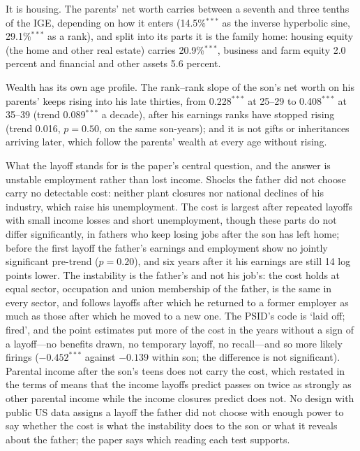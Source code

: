 It is housing. The parents' net worth carries between a seventh and three tenths of the IGE, depending on how it
enters (14.5\%$^{***}$ as the inverse hyperbolic sine, 29.1\%$^{***}$ as a rank), and split into its parts it is the
family home: housing equity (the home and other real estate) carries 20.9\%$^{***}$, business and farm equity 2.0 percent and financial and other assets
5.6 percent.

Wealth has its own age profile. The rank--rank slope of the son's net worth on his parents' keeps rising into his late
thirties, from 0.228$^{***}$ at 25--29 to 0.408$^{***}$ at 35--39 (trend 0.089$^{***}$ a decade), after his earnings
ranks have stopped rising (trend 0.016, $p = 0.50$, on the same son-years); and it is not gifts or inheritances
arriving later, which follow the parents' wealth at every age without rising.

What the layoff stands for is the paper's central question, and the answer is unstable employment rather than lost
income. Shocks the father did not choose carry no detectable cost: neither plant closures nor national declines of his
industry, which raise his unemployment. The cost is largest after repeated layoffs with small income losses and short
unemployment, though these parts do not differ significantly, in fathers who keep losing jobs after the son has left
home; before the first layoff the father's earnings and employment show no jointly significant pre-trend ($p = 0.20$),
and six years after it his earnings are still 14 log points lower. The instability is
the father's and not his job's: the cost holds at equal sector, occupation and union membership of the father, is the
same in every sector, and follows layoffs after which he returned to a former employer as much as those after which he
moved to a new one. The PSID's code is `laid off; fired', and the point estimates put more of the cost in the years
without a sign of a layoff---no benefits drawn, no temporary layoff, no recall---and so more likely firings
($-0.452^{***}$ against $-0.139$ within son; the difference is not significant). Parental income after the son's teens
does not carry the cost,
which restated in the terms of \citet{shea2000does} means that the income layoffs predict passes on twice as
strongly as other parental income while the income closures predict does not. No design with
public US data assigns a layoff the father did not choose with enough power to say whether the cost is what the
instability does to the son or what it reveals about the father; the paper says which reading each test supports.

